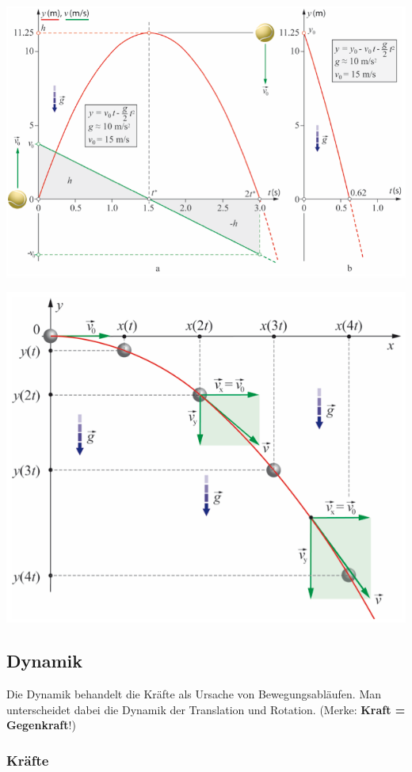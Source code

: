 \documentclass[
a4paper,
oneside,
landscape, 
8pt,
]{scrartcl}
\begin{document}
\begin{multicols*}{2}
\begin{minipage}[h!]{0.5\linewidth}
\includegraphics[width=0.9\linewidth]{images/senkrechter_wurf}
\end{minipage}
\hfill
\begin{minipage}[hbt]{0.5\linewidth}
\includegraphics[width=0.9\linewidth]{images/horizontaler_wurf}
\end{minipage}


\clearpage


\subsection{Dynamik}
Die Dynamik behandelt die Kräfte als Ursache von Bewegungsabläufen. Man unterscheidet dabei die Dynamik der Translation und Rotation. (Merke: \textbf{Kraft = Gegenkraft}!)

\subsubsection{Kräfte}


\end{multicols*}
\end{document}

